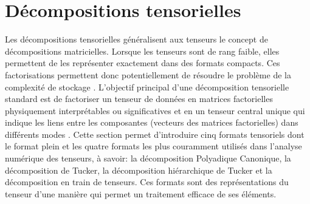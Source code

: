 \documentclass[11pt,a4paper,oneside]{book}
\begin{document}
\section{Décompositions tensorielles}
\label{sec:2.4formats}
Les décompositions tensorielles généralisent aux tenseurs le concept de décompositions
matricielles. Lorsque les tenseurs sont de rang faible, elles permettent de les représenter
exactement dans des formats compacts. Ces factorisations permettent donc potentiellement
de résoudre le problème de la complexité de stockage \cite[p.53]{olivier2017decompositions}. L'objectif principal d'une décomposition tensorielle standard est de factoriser un tenseur de données en matrices factorielles physiquement interprétables ou significatives et en un tenseur central unique qui indique les liens entre les composantes (vecteurs des matrices factorielles) dans différents modes \cite[p.7]{cichocki2014era}. Cette section permet d’introduire cinq formats tensoriels dont le format plein et les
quatre formats  les plus couramment utilisés dans l'analyse numérique des tenseurs, à savoir: la décomposition Polyadique Canonique, la décomposition de Tucker, la décomposition  hiérarchique de Tucker et la décomposition en train de tenseurs. Ces formats sont des représentations du tenseur d'une manière qui permet un traitement efficace de ses éléments. 
\end{document}
